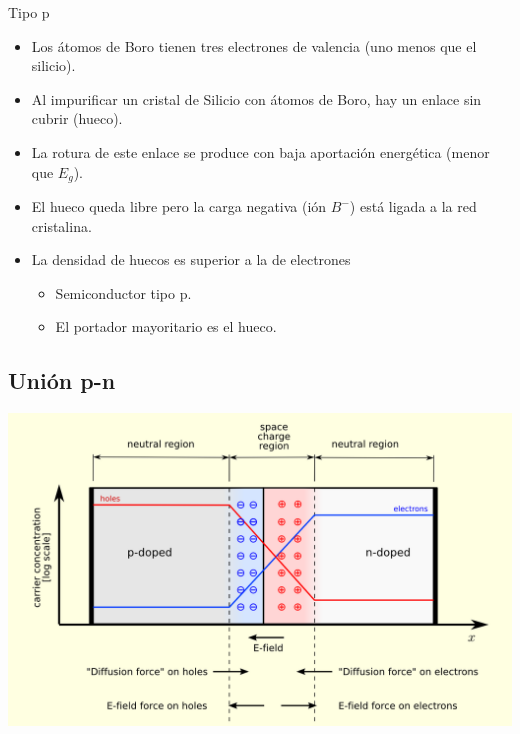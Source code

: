 \documentclass[xcolor={usenames,svgnames,dvipsnames}]{beamer}
\begin{document}
\begin{frame}[label=sec-1-3-5]{Tipo p}
\begin{itemize}
\item Los átomos de \alert{Boro} tienen tres electrones de valencia (uno menos
que el silicio).

\item Al impurificar un cristal de Silicio con átomos de Boro, hay un
enlace sin cubrir (hueco).

\item La rotura de este enlace se produce con \alert{baja aportación energética}
   (menor que $E_{g}$).

\item El \alert{hueco queda libre} pero la \alert{carga negativa (ión $B^{-}$) está
ligada} a la red cristalina.

\item La \alert{densidad de huecos} es \alert{superior a la de electrones}

\begin{itemize}
\item Semiconductor \alert{tipo p}.

\item El \alert{portador mayoritario} es el \alert{hueco}.
\end{itemize}
\end{itemize}
\end{frame}

\subsection{Unión p-n}
\label{sec-1-4}


\begin{frame}[label=sec-1-4-1]{}
\includegraphics[width=.9\linewidth]{../figs/Pn-junction-equilibrium.png}
\end{frame}
\end{document}
